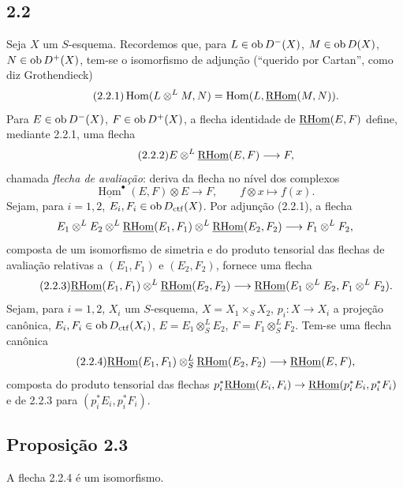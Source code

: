 \subsection*{2.2}
Seja $X$ um $S$-esquema. Recordemos que, para $L\in\operatorname{ob} D^{-}(X)$, $M\in\operatorname{ob} D(X)$, $N\in\operatorname{ob} D^{+}(X)$, tem-se o isomorfismo de adjunção (``querido por Cartan'', como diz Grothendieck)
\begin{equation}\tag{2.2.1}
\operatorname{Hom}(L\otimes^{L}M,N)=\operatorname{Hom}(L,\underline{\mathrm{RHom}}(M,N)).
\end{equation}
Para $E\in\operatorname{ob} D^{-}(X)$, $F\in\operatorname{ob} D^{+}(X)$, a flecha identidade de $\underline{\mathrm{RHom}}(E,F)$ define, mediante 2.2.1, uma flecha
\begin{equation}\tag{2.2.2}
E\otimes^{L}\underline{\mathrm{RHom}}(E,F)\longrightarrow F,
\end{equation}
chamada \emph{flecha de avaliação}: deriva da flecha no nível dos complexos
\[
\underline{\operatorname{Hom}}^{\bullet}(E,F)\otimes E\longrightarrow F,
\qquad f\otimes x\longmapsto f(x).
\]
Sejam, para $i=1,2$, $E_i,F_i\in\operatorname{ob} D_{\mathrm{ctf}}(X)$. Por adjunção (2.2.1), a flecha
\[
E_1\otimes^{L}E_2\otimes^{L}\underline{\mathrm{RHom}}(E_1,F_1)\otimes^{L}\underline{\mathrm{RHom}}(E_2,F_2)\longrightarrow F_1\otimes^{L}F_2,
\]
composta de um isomorfismo de simetria e do produto tensorial das flechas de avaliação relativas a $(E_1,F_1)$ e $(E_2,F_2)$, fornece uma flecha
\begin{equation}\tag{2.2.3}
\underline{\mathrm{RHom}}(E_1,F_1)\otimes^{L}\underline{\mathrm{RHom}}(E_2,F_2)\longrightarrow\underline{\mathrm{RHom}}(E_1\otimes^{L}E_2,F_1\otimes^{L}F_2).
\end{equation}
Sejam, para $i=1,2$, $X_i$ um $S$-esquema, $X=X_1\times_SX_2$, $p_i:X\to X_i$ a projeção canônica, $E_i,F_i\in\operatorname{ob} D_{\mathrm{ctf}}(X_i)$, $E=E_1\otimes^{L}_{S}E_2$, $F=F_1\otimes^{L}_{S}F_2$. Tem-se uma flecha canônica
\begin{equation}\tag{2.2.4}
\underline{\mathrm{RHom}}(E_1,F_1)\otimes^{L}_{S}\underline{\mathrm{RHom}}(E_2,F_2)\longrightarrow\underline{\mathrm{RHom}}(E,F),
\end{equation}
composta do produto tensorial das flechas $p_i^{*}\underline{\mathrm{RHom}}(E_i,F_i)\to\underline{\mathrm{RHom}}(p_i^{*}E_i,p_i^{*}F_i)$ e de 2.2.3 para $(p_i^{*}E_i,p_i^{*}F_i)$.

\subsection*{Proposição 2.3}
A flecha 2.2.4 é um isomorfismo.

